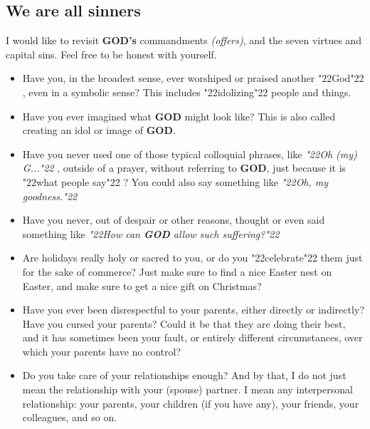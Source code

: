 \documentclass[12pt,a5paper]{article}
\newcommand{\God}[0]{\textbf{GOD}}
\newcommand{\Gods}[0]{\textbf{GOD's}}
\newcommand{\q}[1]{\char"22{#1}\char"22 }
\newcommand{\qq}[1]{\textit{\q{#1}}}
\begin{document}
	\subsection{We are all sinners}
		I would like to revisit {\Gods} commandments \textit{(offers)},
		and the seven virtues and capital sins.
		Feel free to be honest with yourself.
		\\
		\begin{itemize}[nosep]
			\item	Have you,
					in the broadest sense,
					ever worshiped or praised another \q{God},
					even in a symbolic sense?
					This includes \q{idolizing} people and things.
					\\
			\item	Have you ever imagined what {\God} might look like?
					This is also called creating an idol or image of {\God}.
					\\
			\item	Have you never used one of those typical colloquial phrases,
					like \qq{Oh (my) G...},
					outside of a prayer,
					without referring to {\God},
					just because it is \q{what people say}?
					You could also say something like
					\qq{Oh,
					my goodness.}
					\\
			\item	Have you never,
					out of despair or other reasons,
					thought or even said something like
					\qq{How can {\God} allow such suffering?}
					\\
			\item	Are holidays really holy or sacred to you,
					or do you \q{celebrate} them just for the sake of commerce?
					Just make sure to find a nice Easter nest on Easter,
					and make sure to get a nice gift on Christmas?
					\\
			\item	Have you ever been disrespectful to your parents,
					either directly or indirectly?
					Have you cursed your parents?
					Could it be that they are doing their best,
					and it has sometimes been your fault,
					or entirely different circumstances,
					over which your parents have no control?
					\\
			\item	Do you take care of your relationships enough?
					And by that,
					I do not just mean the relationship with your (spouse) partner.
					I mean any interpersonal relationship:
					your parents,
					your children
					(if you have any),
					your friends,
					your colleagues, and so on.
					\\

\end{itemize}
\end{document}
